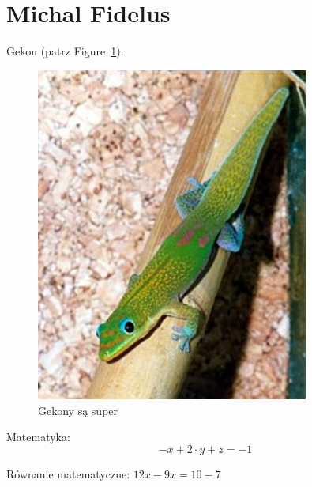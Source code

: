 \section{Michal Fidelus}
\label{sec:mfidelus}

Gekon (patrz Figure~\ref{fig:geck}).

\begin{figure}[htbp]
    \centering
    \includegraphics[width=0.8\textwidth]{pictures/geck.jpg}
    \caption{Gekony są super}
    \label{fig:geck}
\end{figure}






Matematyka: 
\[−x+2⋅y+z=−1\]

Równanie matematyczne:
$12x - 9x = 10 - 7$